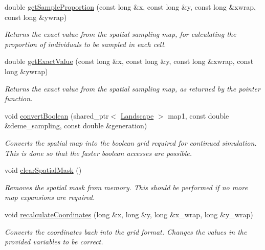 \begin{DoxyCompactItemize}
double \hyperlink{class_data_mask_a682324892b67910b1dd2fa86a98c0873}{get\+Sample\+Proportion} (const long \&x, const long \&y, const long \&xwrap, const long \&ywrap)
\begin{DoxyCompactList}\small\item\em Returns the exact value from the spatial sampling map, for calculating the proportion of individuals to be sampled in each cell. \end{DoxyCompactList}\item 
double \hyperlink{class_data_mask_a2738d996bf7ee99d44a2833b2bed15ef}{get\+Exact\+Value} (const long \&x, const long \&y, const long \&xwrap, const long \&ywrap)
\begin{DoxyCompactList}\small\item\em Returns the exact value from the spatial sampling map, as returned by the pointer function. \end{DoxyCompactList}\item 
void \hyperlink{class_data_mask_a5d0b9245784515c0a2a005c9881551e1}{convert\+Boolean} (shared\+\_\+ptr$<$ \hyperlink{class_landscape}{Landscape} $>$ map1, const double \&deme\+\_\+sampling, const double \&generation)
\begin{DoxyCompactList}\small\item\em Converts the spatial map into the boolean grid required for continued simulation. This is done so that the faster boolean accesses are possible. \end{DoxyCompactList}\item 
void \hyperlink{class_data_mask_a2d152bcb13820a9061ea85c984e042a7}{clear\+Spatial\+Mask} ()\hypertarget{class_data_mask_a2d152bcb13820a9061ea85c984e042a7}{}\label{class_data_mask_a2d152bcb13820a9061ea85c984e042a7}

\begin{DoxyCompactList}\small\item\em Removes the spatial mask from memory. This should be performed if no more map expansions are required. \end{DoxyCompactList}\item 
void \hyperlink{class_data_mask_a5eaef817c1baf4ac14d06d0e92bd4787}{recalculate\+Coordinates} (long \&x, long \&y, long \&x\+\_\+wrap, long \&y\+\_\+wrap)
\begin{DoxyCompactList}\small\item\em Converts the coordinates back into the grid format. Changes the values in the provided variables to be correct. \end{DoxyCompactList}\end{DoxyCompactItemize}
